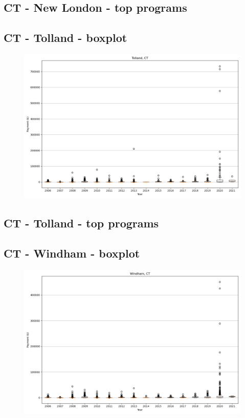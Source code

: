 \subsection*{CT - New London - top programs}

\newpage
\subsection*{CT - Tolland - boxplot}
\begin{figure}[h]
\centering
\includegraphics[width=7in]{../output/boxplots/counties/Tolland-CT_boxplot.png}
\end{figure}


\subsection*{CT - Tolland - top programs}

\newpage
\subsection*{CT - Windham - boxplot}
\begin{figure}[h]
\centering
\includegraphics[width=7in]{../output/boxplots/counties/Windham-CT_boxplot.png}
\end{figure}


